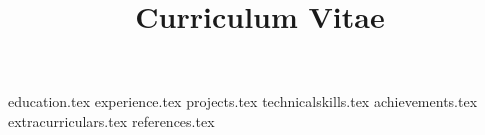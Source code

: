 \documentclass[11pt,a4paper,sans]{moderncv}
\title{Curriculum Vitae}
\begin{document}
\makecvtitle

{education.tex}
{experience.tex}
{projects.tex}
{technicalskills.tex}
{achievements.tex}
{extracurriculars.tex}
{references.tex}
\end{document}
